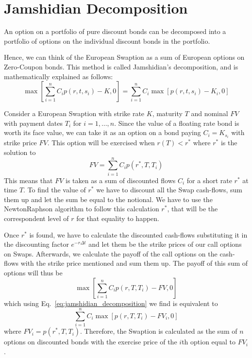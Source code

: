 \documentclass[12pt,a4paper]{article}
\begin{document}
\clearpage
\section{Jamshidian Decomposition}
An option on a portfolio of pure discount bonds can be decomposed into a portfolio of options on the individual discount bonds in the
portfolio.

Hence, we can think of the European Swaption as a sum of European
options on Zero-Coupon bonds. This method is called Jamshidian’s decomposition, and is mathematically explained as follows:
\begin{equation}
\max\left[\sum_{i=1}^n C_i p(r, t, s_i) - K, 0\right] = \sum_{i=1}^n C_i \max\left[p(r, t, s_i) - K_i, 0\right]
\label{eq:jamshidian_decomposition}
\end{equation}

Consider a European Swaption with strike rate $K$, maturity $T$ and nominal $FV$
with payment dates $T_i$ for $i = 1,\ldots, n$. Since the value of a floating rate bond is worth its face value, we can take it as an option on a bond paying $C_i = K_{s_i}$ with strike price $FV$. This option will be exercised when $r(T) < r^*$ where $r^*$ is the solution to
\begin{equation}
FV = \sum_{i=1}^n C_i p(r^*, T, T_i)
\end{equation}
This means that $FV$ is taken as a sum of discounted flows $C_i$ for a short rate $r^*$ at time $T$. To find the value of $r^*$ we have to discount all the Swap cash-flows, sum them up and let the sum be equal to the notional. We have to use the NewtonRaphson algorithm to follow this calculation $r^*$, that will be the correspondent level of $r$ for that equality to happen. 

Once $r^*$ is found, we have to calculate the discounted cash-flows substituting it in the discounting factor $e^{-r\Delta t}$ and let them be the strike prices of our call options on Swaps.
Afterwards, we calculate the payoff of the call options on the cash-flows with
the strike price mentioned and sum them up. The payoff of this sum of options
will thus be
\begin{equation}
\max\left[\sum_{i=1}^n C_ip(r, T, T_i)-FV, 0\right]
\end{equation}
which using Eq.~\ref{eq:jamshidian_decomposition} we find is equivalent to
\begin{equation}
\sum_{i=1}^n C_i \max\left[p(r, T, T_i)-FV_i, 0\right]
\end{equation}
where $FV_i = p(r^*, T, T_i)$. 
Therefore, the Swaption is calculated as the sum of $n$ options on discounted bonds with the exercise price of the $i$th option equal to $FV_i$.
\end{document}
